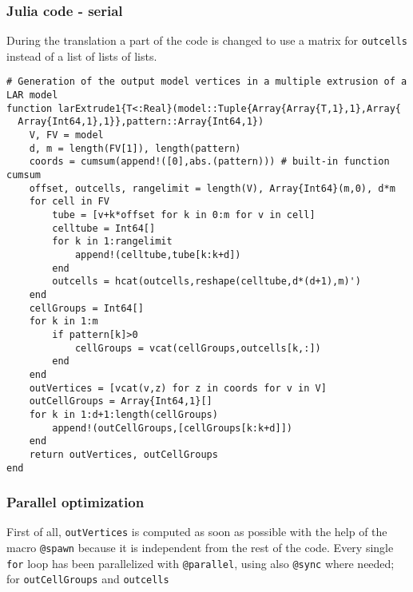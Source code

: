 \documentclass[a4paper,12pt,titlepage]{article}					%
\begin{document}
\subsubsection{Julia code - serial}
During the translation a part of the code is changed to use a matrix for \texttt{outcells} instead of a list of lists of lists.

\begin{Verbatim}
# Generation of the output model vertices in a multiple extrusion of a LAR model
function larExtrude1{T<:Real}(model::Tuple{Array{Array{T,1},1},Array{
  Array{Int64,1},1}},pattern::Array{Int64,1})
	V, FV = model
	d, m = length(FV[1]), length(pattern)
	coords = cumsum(append!([0],abs.(pattern))) # built-in function cumsum
	offset, outcells, rangelimit = length(V), Array{Int64}(m,0), d*m
	for cell in FV
		tube = [v+k*offset for k in 0:m for v in cell]
		celltube = Int64[]
		for k in 1:rangelimit
			append!(celltube,tube[k:k+d])
		end
		outcells = hcat(outcells,reshape(celltube,d*(d+1),m)')
	end
	cellGroups = Int64[]
	for k in 1:m
		if pattern[k]>0
			cellGroups = vcat(cellGroups,outcells[k,:])
		end
	end
	outVertices = [vcat(v,z) for z in coords for v in V]
	outCellGroups = Array{Int64,1}[]
	for k in 1:d+1:length(cellGroups)
		append!(outCellGroups,[cellGroups[k:k+d]])
	end
	return outVertices, outCellGroups
end
\end{Verbatim}

\subsubsection{Parallel optimization}
First of all, \texttt{outVertices} is computed as soon as possible with the help of the macro \texttt{@spawn} because it is independent from the rest of the code.
Every single \texttt{for} loop has been parallelized with \texttt{@parallel}, using also \texttt{@sync} where needed;
for \texttt{outCellGroups} and \texttt{outcells} %
\end{document}
